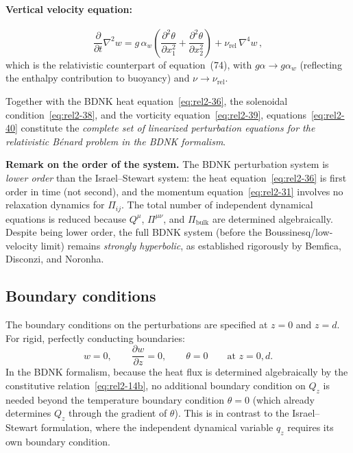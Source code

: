 \paragraph{Vertical velocity equation:}
\begin{equation}
\label{eq:rel2-40}
  \frac{\partial}{\partial t}\nabla^2 w
  = g\,\alpha_w\!\left(
      \frac{\partial^2\theta}{\partial x_1^2}
      + \frac{\partial^2\theta}{\partial x_2^2}
    \right)
    + \nu_{\mathrm{rel}}\,\nabla^4 w\,,
\end{equation}
which is the relativistic counterpart of equation~(74), with
$g\alpha \to g\alpha_w$ (reflecting the enthalpy contribution to buoyancy)
and $\nu \to \nu_{\mathrm{rel}}$.

Together with the BDNK heat equation~\eqref{eq:rel2-36}, the
solenoidal condition~\eqref{eq:rel2-38}, and the vorticity
equation~\eqref{eq:rel2-39}, equations~\eqref{eq:rel2-40} constitute the
\emph{complete set of linearized perturbation equations for the
relativistic B\'enard problem in the BDNK formalism}.

\medskip
\noindent\textbf{Remark on the order of the system.}\quad
The BDNK perturbation system is \emph{lower order} than the Israel--Stewart
system: the heat equation~\eqref{eq:rel2-36} is first order in time
(not second), and the momentum equation~\eqref{eq:rel2-31} involves no
relaxation dynamics for $\Pi_{ij}$.  The total number of independent
dynamical equations is reduced because $Q^\mu$, $\Pi^{\mu\nu}$, and
$\Pi_{\mathrm{bulk}}$ are determined algebraically.  Despite being lower
order, the full BDNK system (before the Boussinesq/low-velocity limit)
remains \emph{strongly hyperbolic}, as established rigorously by
Bemfica, Disconzi, and Noronha.

\subsection{Boundary conditions}\label{sec:rel9g}

The boundary conditions on the perturbations are specified at $z = 0$ and
$z = d$.  For rigid, perfectly conducting boundaries:
\begin{equation}
\label{eq:rel2-41}
  w = 0, \qquad \frac{\partial w}{\partial z} = 0, \qquad
  \theta = 0 \qquad \text{at } z = 0, d.
\end{equation}
In the BDNK formalism, because the heat flux is determined algebraically
by the constitutive relation~\eqref{eq:rel2-14b}, no additional boundary
condition on $Q_z$ is needed beyond the temperature boundary condition
$\theta = 0$ (which already determines $Q_z$ through the gradient of
$\theta$).  This is in contrast to the Israel--Stewart formulation, where
the independent dynamical variable $q_z$ requires its own boundary
condition.

